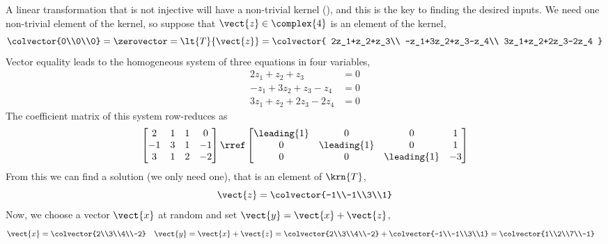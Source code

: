 A linear transformation that is not injective will have a non-trivial kernel (), and this is the key to finding the desired inputs.  We need one non-trivial element of the kernel, so suppose that $\vect{z}\in\complex{4}$ is an element of the kernel,
%
\begin{equation*}
\colvector{0\\0\\0}
=\zerovector
=\lt{T}{\vect{z}}
=\colvector{
2z_1+z_2+z_3\\
-z_1+3z_2+z_3-z_4\\
3z_1+z_2+2z_3-2z_4
}
\end{equation*}
%
Vector equality  leads to the homogeneous system of three equations in four variables,
%
\begin{align*}
2z_1+z_2+z_3&=0\\
-z_1+3z_2+z_3-z_4&=0\\
3z_1+z_2+2z_3-2z_4&=0
\end{align*}
%
The coefficient matrix of this system row-reduces as
\begin{equation*}
\begin{bmatrix}
 2 & 1 & 1 & 0 \\
 -1 & 3 & 1 & -1 \\
 3 & 1 & 2 & -2
\end{bmatrix}
\rref
\begin{bmatrix}
 \leading{1} & 0 & 0 & 1 \\
 0 & \leading{1} & 0 & 1 \\
 0 & 0 & \leading{1} & -3
\end{bmatrix}
\end{equation*}
%
From this we can find a solution (we only need one), that is an element of $\krn{T}$,
%
\begin{equation*}
\vect{z}=\colvector{-1\\-1\\3\\1}
\end{equation*}
%
Now, we choose a vector $\vect{x}$ at random and set $\vect{y}=\vect{x}+\vect{z}$,
%
\begin{align*}
\vect{x}
&=\colvector{2\\3\\4\\-2}
&
\vect{y}&=\vect{x}+\vect{z}=
\colvector{2\\3\\4\\-2}+\colvector{-1\\-1\\3\\1}
=\colvector{1\\2\\7\\-1}
\end{align*}
